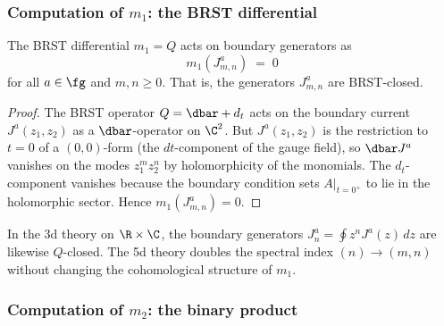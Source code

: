 \subsubsection{Computation of \texorpdfstring{$m_1$}{m1}: the BRST differential}

\begin{proposition}
\label{prop:DDCA-m1}
The BRST differential $m_1 = Q$ acts on boundary generators
as
\[
 m_1(J^a_{m,n}) \;=\; 0
\]
for all $a \in \fg$ and $m,n \ge 0$. That is, the
generators $J^a_{m,n}$ are BRST-closed.
\end{proposition}

\begin{proof}
The BRST operator $Q = \dbar + d_t$ acts on the
boundary current $J^a(z_1,z_2)$ as a $\dbar$-operator on
$\C^2$. But $J^a(z_1,z_2)$ is the restriction to $t=0$
of a $(0,0)$-form (the $dt$-component of the gauge field),
so $\dbar J^a$ vanishes on the modes $z_1^m z_2^n$ by
holomorphicity of the monomials. The $d_t$-component
vanishes because the boundary condition sets
$A|_{t=0^+}$ to lie in the holomorphic sector. Hence
$m_1(J^a_{m,n}) = 0$.
\end{proof}

\begin{remark}
In the 3d theory on $\R\times\C$, the boundary generators
$J^a_n = \oint z^n J^a(z)\,dz$ are likewise $Q$-closed.
The 5d theory doubles the spectral index
$(n) \to (m,n)$ without changing the cohomological
structure of $m_1$.
\end{remark}

\subsubsection{Computation of \texorpdfstring{$m_2$}{m2}: the binary product}

